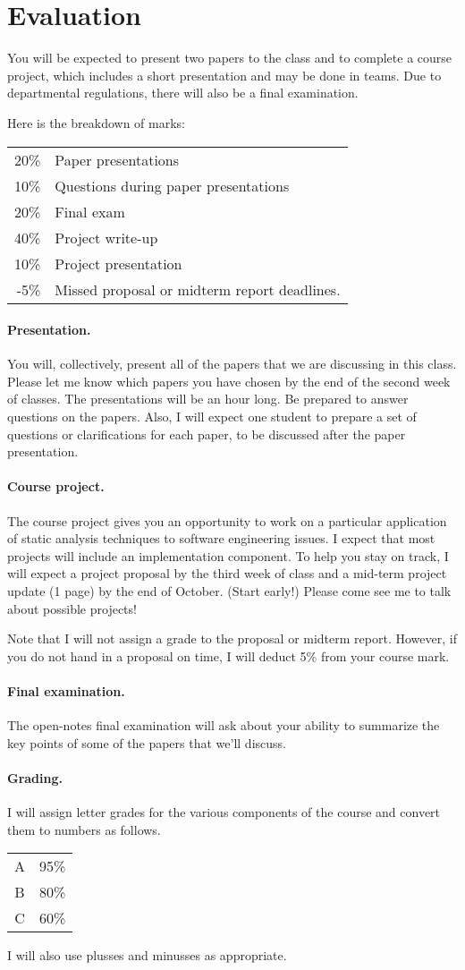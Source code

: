 \documentclass{article}
\begin{document}
\section*{Evaluation}
You will be expected to present two papers to the class and to
complete a course project, which includes a short presentation and may
be done in teams. Due to departmental regulations, there will also
be a final examination.

Here is the breakdown of marks:

\begin{tabular}{rl}
20\% & Paper presentations \\
10\% & Questions during paper presentations \\
20\% & Final exam \\
40\% & Project write-up \\
10\% & Project presentation \\
-5\% & Missed proposal or midterm report deadlines.
\end{tabular}

\paragraph{Presentation.} You will, collectively, present all of the 
papers that we are discussing in this class. Please let me know which
papers you have chosen by the end of the second week of classes. The
presentations will be an hour long. Be prepared to answer questions on
the papers. Also, I will expect one student to prepare a set of
questions or clarifications for each paper, to be discussed after the
paper presentation.

\paragraph{Course project.} The course project gives you an opportunity to
work on a particular application of static analysis techniques to
software engineering issues. I expect that most projects will include
an implementation component. To help you stay on track, I will expect
a project proposal by the third week of class and a mid-term project
update (1 page) by the end of October. (Start early!) Please come see me
to talk about possible projects!

Note that I will not assign a grade to the proposal or midterm
report. However, if you do not hand in a proposal on time, I will deduct 
5\% from your course mark.

\paragraph{Final examination.} The open-notes final examination will ask about
your ability to summarize the key points of some of the papers that we'll
discuss.

\paragraph{Grading.} I will assign letter grades for the various components
of the course and convert them to numbers as follows.

\begin{tabular}{cc}
A & 95\% \\
B & 80\% \\
C & 60\% \\
\end{tabular}

I will also use plusses and minusses as appropriate.
\end{document}
